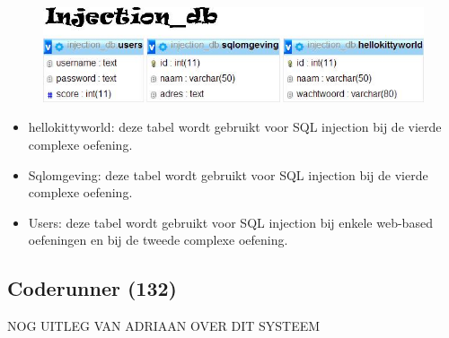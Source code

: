 \begin{figure}[H]
\centering
\includegraphics[scale=0.5]{systeem/db2.jpg}
\end{figure}
	\begin{itemize}
	\item hellokittyworld: deze tabel wordt gebruikt voor SQL injection bij de vierde complexe oefening.
	\item Sqlomgeving: deze tabel wordt gebruikt voor SQL injection bij de vierde complexe oefening.
	\item Users: deze tabel wordt gebruikt voor SQL injection bij enkele web-based oefeningen en bij de tweede complexe oefening.
	\end{itemize}


\subsection{Coderunner (132)}
NOG UITLEG VAN ADRIAAN OVER DIT SYSTEEM